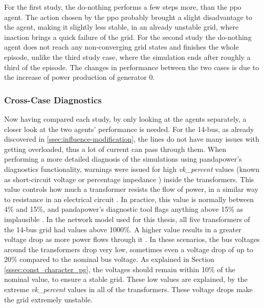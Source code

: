 For the first study, the do-nothing performs a few steps more, than the \ac{ppo} agent. The action chosen by the \ac{ppo} probably brought a slight disadvantage to the agent, making it slightly less stable, in an already unstable grid, where inaction brings a quick failure of the grid. For the second study the do-nothing agent does not reach any non-converging grid states and finishes the whole episode, unlike the third study case, where the simulation ends after roughly a third of the episode. The changes in performance between the two cases is due to the increase of power production of generator 0. 

\subsubsection{Cross-Case Diagnostics} 
Now having compared each study, by only looking at the agents separately, a closer look at the two agents' performance is needed. For the 14-bus, as already discovered in \ref{ssec:influence-modification}, the lines do not have many issues with getting overloaded, thus a lot of current can pass through them. When performing a more detailed diagnosis of the simulations using pandapower's diagnostics functionality, warnings were issued for high \textit{vk\_percent} values (known as short-circuit voltage \cite{pandapower_docs} or percentage impedance \cite{impedance_percentage}) inside the transformers. This value controls how much a transformer resists the flow of power, in a similar way to resistance in an electrical circuit \cite{impedance_percentage}. In practice, this value is normally between 4\% and 15\%, and pandapower's diagnostic tool flags anything above 15\% as implausible \cite{pandapower_docs}. In the network model used for this thesis, all five transformers of the 14-bus grid had values above 1000\%. A higher value results in a greater voltage drop as more power flows through it \cite{impedance_percentage,transformer_impedance_regulation}. In these scenarios, the bus voltages around the transformers drop very low, sometimes even a voltage drop of up to 20\% compared to the nominal bus voltage. As explained in Section \ref{sssec:const_character_pg}, the voltages should remain within 10\% of the nominal value, to ensure a stable grid. These low values are explained, by the extreme \textit{vk\_percent} values in all of the transformers. These voltage drops make the grid extremely unstable. 

